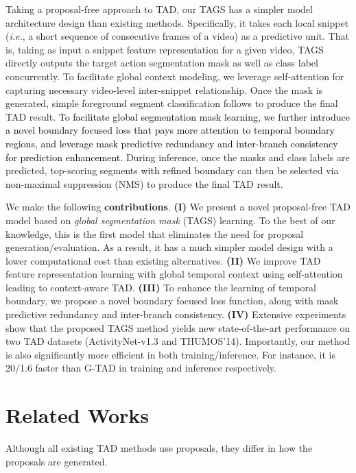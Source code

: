 \documentclass[runningheads]{llncs}
\newcommand{\ie}{\textit{i.e.}}
\newcommand{\shortmodelname}{TAGS}
\begin{document}
Taking a proposal-free approach to TAD, our {\shortmodelname} has a simpler model architecture design than existing methods. Specifically, it takes each local snippet (\ie, a short sequence of consecutive frames of a video) as a predictive unit. That is, taking as input a snippet feature representation for a given video,
{\shortmodelname} directly outputs the target action segmentation mask as well as class label concurrently.
To facilitate global context modeling,
we leverage self-attention \cite{vaswani2017attention} 
for capturing necessary video-level inter-snippet relationship. Once the mask is generated, simple foreground segment classification follows to produce the final TAD result. 
\textcolor{black}{To facilitate global segmentation mask learning, we further introduce a novel boundary focused loss that pays more attention to temporal boundary regions, and leverage mask predictive redundancy and inter-branch consistency for
prediction enhancement.} 
During inference, once the masks and class labels are predicted, 
top-scoring segments \textcolor{black}{with refined boundary} can then be selected via non-maximal suppression (NMS)
to produce the final TAD result. 


We make the following {\bf contributions}.
{\bf (I)} We present a novel proposal-free TAD model based on {\em global segmentation mask} ({\shortmodelname}) learning. To the best of our knowledge, this is the first model that eliminates the need for proposal generation/evaluation. As a result, it has a much simpler model design with a lower computational cost than existing alternatives. 
{\bf (II)} 
We improve TAD feature representation learning with global 
temporal context using self-attention leading to context-aware TAD. 
{{\bf (III)} To enhance the learning of temporal boundary, {\color{black} we propose a novel boundary focused loss function, along with mask predictive redundancy and inter-branch consistency.}}
{\bf (IV)}
Extensive experiments show that the proposed {\shortmodelname} method yields new state-of-the-art performance on two TAD datasets (ActivityNet-v1.3 and THUMOS'14).
Importantly, our method is also significantly more efficient in both training/inference. For instance, it is
 {20/1.6} faster than G-TAD \cite{xu2020g} in training and inference respectively.


\section{Related Works}
\label{sec:related}
Although all existing TAD methods use proposals, they differ in how the proposals are generated.
\end{document}

